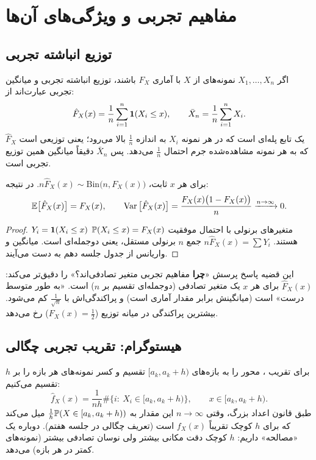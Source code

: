 \section{مفاهیم تجربی و ویژگی‌های آن‌ها}

\subsection{توزیع انباشته تجربی}
اگر $X_1,\ldots,X_n$ نمونه‌های  از $X$ با  آماری $F_X$ باشند، توزیع انباشته تجربی و میانگین تجربی عبارت‌اند از:
\[
\hat F_X(x)=\frac1n\sum_{i=1}^{n}\mathbf{1}(X_i\le x),\qquad \bar X_n=\frac1n\sum_{i=1}^{n}X_i .
\]
$\hat F_X$ یک تابع پله‌ای است که در هر نمونه $X_i$ به اندازه $\frac1n$ بالا می‌رود؛ یعنی توزیعی است که به هر نمونه مشاهده‌شده جرم احتمال $\frac1n$ می‌دهد. پس $\bar X_n$ دقیقاً میانگین همین توزیع تجربی است.

\begin{theorem}
برای هر $x$ ثابت، $n\hat F_X(x)\sim\mathrm{Bin}\big(n,F_X(x)\big)$. در نتیجه:
\[
\mathbb{E}\big[\hat F_X(x)\big]=F_X(x),\qquad \operatorname{Var}\big[\hat F_X(x)\big]=\frac{F_X(x)\big(1-F_X(x)\big)}{n}\xrightarrow{n\to\infty}0 .
\]
\end{theorem}
\begin{proof}
$Y_i=\mathbf{1}(X_i\le x)$ متغیرهای برنولی  با احتمال موفقیت $\mathbb{P}(X_i\le x)=F_X(x)$ هستند. $n\hat F_X(x)=\sum Y_i$ جمع $n$ برنولی مستقل، یعنی دوجمله‌ای است. میانگین و واریانس از جدول جلسه دهم به دست می‌آیند.
\end{proof}

\begin{note}
\notetitle این قضیه پاسخ پرسش «\textbf{چرا} مفاهیم تجربی متغیر تصادفی‌اند؟» را دقیق‌تر می‌کند: $\hat F_X(x)$ برای هر $x$ یک متغیر تصادفی (دوجمله‌ای تقسیم بر $n$) است. «به طور متوسط درست» است (میانگینش برابر مقدار آماری است) و پراکندگی‌اش با $\frac1{\sqrt n}$ کم می‌شود. بیشترین پراکندگی در میانه توزیع ($F_X(x)=\frac12$) رخ می‌دهد.
\end{note}

\subsection{هیستوگرام: تقریب تجربی چگالی}
برای تقریب ، محور را به بازه‌های $[a_k,a_k+h)$ تقسیم و کسر نمونه‌های هر بازه را بر $h$ تقسیم می‌کنیم:
\[
\hat f_X(x)=\frac{1}{nh}\#\{i:\ X_i\in[a_k,a_k+h)\},\qquad x\in[a_k,a_k+h).
\]
طبق قانون اعداد بزرگ، وقتی $n\to\infty$ این مقدار به $\frac{1}{h}\mathbb{P}(X\in[a_k,a_k+h))$ میل می‌کند که برای $h$ کوچک تقریباً $f_X(x)$ است (تعریف چگالی در جلسه هفتم). دوباره یک «مصالحه» داریم: $h$ کوچک دقت مکانی بیشتر ولی نوسان تصادفی بیشتر (نمونه‌های کمتر در هر بازه) می‌دهد.

